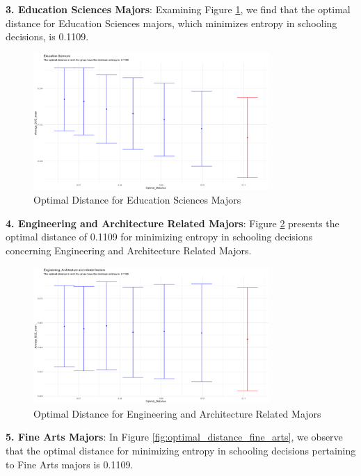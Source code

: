 \textbf{ 3. Education Sciences Majors}:
   Examining Figure \ref{fig:optimal_distance_edu_sci}, we find that the optimal distance for Education Sciences majors, which minimizes entropy in schooling decisions, is 0.1109.

\begin{figure}[H]
    \centering
    \includegraphics[width=0.8\textwidth]{Graph/Results/optimal_distance_bs30_EDUCATION_SCIENCES.png}
    \caption{Optimal Distance for Education Sciences Majors}
    \label{fig:optimal_distance_edu_sci}
\end{figure}

\textbf{ 4. Engineering and Architecture Related Majors}:
   Figure \ref{fig:optimal_distance_eng_arch} presents the optimal distance of 0.1109 for minimizing entropy in schooling decisions concerning Engineering and Architecture Related Majors.

\begin{figure}[H]
    \centering
    \includegraphics[width=0.8\textwidth]{Graph/Results/optimal_distance_bs30_ENG_ARCH_RELATED.png}
    \caption{Optimal Distance for Engineering and Architecture Related Majors}
    \label{fig:optimal_distance_eng_arch}
\end{figure}

\textbf{5. Fine Arts Majors}:
   In Figure \ref{fig:optimal_distance_fine_arts}, we observe that the optimal distance for minimizing entropy in schooling decisions pertaining to Fine Arts majors is 0.1109.

